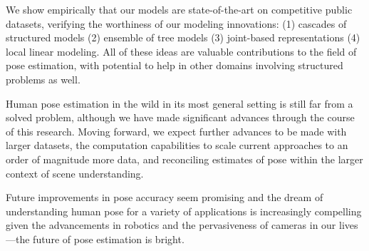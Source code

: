 We show empirically that our models are state-of-the-art on competitive public 
datasets, verifying the worthiness of our modeling innovations: (1) cascades of 
structured models (2) ensemble of tree models (3) joint-based representations 
(4) local linear modeling.  All of these ideas are valuable contributions to 
the field of pose estimation, with potential to help in other domains involving 
structured problems as well.

Human pose estimation in the wild in its most general setting is still far from 
a solved problem, although we have made significant advances through the course 
of this research.  Moving forward, we expect further advances to be made with 
larger datasets, the computation capabilities to scale current approaches to an 
order of magnitude more data, and reconciling estimates of pose within the 
larger context of scene understanding.

Future improvements in pose accuracy seem promising and the dream of 
understanding human pose for a variety of applications is increasingly 
compelling given the advancements in robotics and the pervasiveness of cameras 
in our lives---the future of pose estimation is bright.
